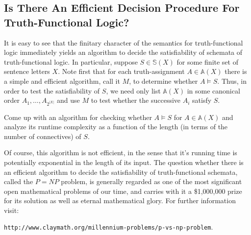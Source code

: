 \subsection{Is There An Efficient Decision Procedure For Truth-Functional Logic?}

It is easy to see that the finitary character of the semantics for truth-functional logic immediately yields an algorithm to decide the satisfiability of schemata of truth-functional logic. In particular, suppose $S\in\mathbb{S}(X)$ for some finite set of sentence letters $X$. Note first that for each truth-assignment $A\in\mathbb{A}(X)$ there is a simple and efficient algorithm, call it $M$, to determine whether $A \models S$. Thus, in order to test the satisfiability of $S$, we need only list $\mathbb{A}(X)$ in some canonical order $A_1,\ldots, A_{2^{|X|}}$ and use $M$ to test whether the successive $A_i$ satisfy $S$. 

\begin{aside}
    Come up with an algorithm for checking whether $A \models S$ for $A\in\mathbb{A}(X)$ and analyze its runtime complexity as a function of the length (in terms of the number of connectives) of $S$. 
\end{aside}

Of course, this algorithm is not efficient, in the sense that it's running time is potentially exponential in the length of its input. The question whether there is an efficient algorithm to decide the satisfiability of truth-functional schemata, called the $P = NP$ problem, is generally regarded as one of the most significant open mathematical problems of our time, and carries with it a \$1,000,000 prize for its solution as well as eternal mathematical glory. For further information visit: 

\verb|http://www.claymath.org/millennium-problems/p-vs-np-problem|.